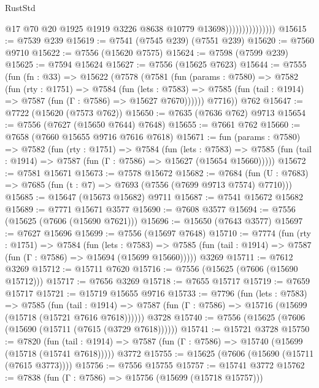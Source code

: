 \begin{lexlean}{RustStd}
\begin{coremodule}
                                  @17
                                  @70
                                  @20
                                  @1925
                                  @1919
                                  @3226
                                  @8638
                                  @10779
                                  @13698)))))))))))))))
@15615 := @7539 @239
@15619 := @7541 (@7545 @239) (@7551 @239)
@15620 := @7560 @9710
@15622 := @7556 (@15620 @7575)
@15624 := @7598 (@7599 @239)
@15625 := @7594 @15624
@15627 := @7556 (@15625 @7623)
@15644 := @7555
    (fun (fn : @33) =>
    @15622
      (@7578
        (@7581
          (fun (params : @7580) =>
          @7582
            (fun (rty : @1751) =>
            @7584
              (fun (lets : @7583) =>
              @7585 (fun (tail : @1914) => @7587 (fun (Γ : @7586) => @15627 @7670))))))
        @7716))
    @762
@15647 := @7722 (@15620 (@7573 @762))
@15650 := @7635 (@7636 @762) @9713
@15654 := @7556 (@7627 (@15650 @7644) @7648)
@15655 := @7661 @762
@15660 := @7658 (@7660 @15655 @9716 @7616 @7618)
@15671 := fun (params : @7580) =>
  @7582
    (fun (rty : @1751) =>
    @7584
      (fun (lets : @7583) =>
      @7585 (fun (tail : @1914) => @7587 (fun (Γ : @7586) => @15627 (@15654 @15660)))))
@15672 := @7581 @15671
@15673 := @7578 @15672
@15682 := @7684 (fun (U : @7683) => @7685 (fun (t : @7) => @7693 (@7556 (@7699 @9713 @7574) @7710)))
@15685 := @15647 (@15673 @15682) @9711
@15687 := @7541 @15672 @15682
@15689 := @7771 @15671 @3577
@15690 := @7608 @3577
@15694 := @7556 (@15625 (@7606 (@15690 @7621)))
@15696 := @15650 (@7643 @3577)
@15697 := @7627 @15696
@15699 := @7556 (@15697 @7648)
@15710 := @7774
    (fun (rty : @1751) =>
    @7584
      (fun (lets : @7583) =>
      @7585 (fun (tail : @1914) => @7587 (fun (Γ : @7586) => @15694 (@15699 @15660)))))
    @3269
@15711 := @7612 @3269
@15712 := @15711 @7620
@15716 := @7556 (@15625 (@7606 (@15690 @15712)))
@15717 := @7656 @3269
@15718 := @7655 @15717
@15719 := @7659 @15717
@15721 := @15719 @15655 @9716
@15733 := @7796
    (fun (lets : @7583) =>
    @7585
      (fun (tail : @1914) =>
      @7587 (fun (Γ : @7586) => @15716 (@15699 (@15718 (@15721 @7616 @7618))))))
    @3728
@15740 := @7556 (@15625 (@7606 (@15690 (@15711 (@7615 (@3729 @7618))))))
@15741 := @15721 @3728
@15750 := @7820
    (fun (tail : @1914) => @7587 (fun (Γ : @7586) => @15740 (@15699 (@15718 (@15741 @7618)))))
    @3772
@15755 := @15625 (@7606 (@15690 (@15711 (@7615 @3773))))
@15756 := @7556 @15755
@15757 := @15741 @3772
@15762 := @7838 (fun (Γ : @7586) => @15756 (@15699 (@15718 @15757)))

\end{coremodule}
\end{lexlean}
